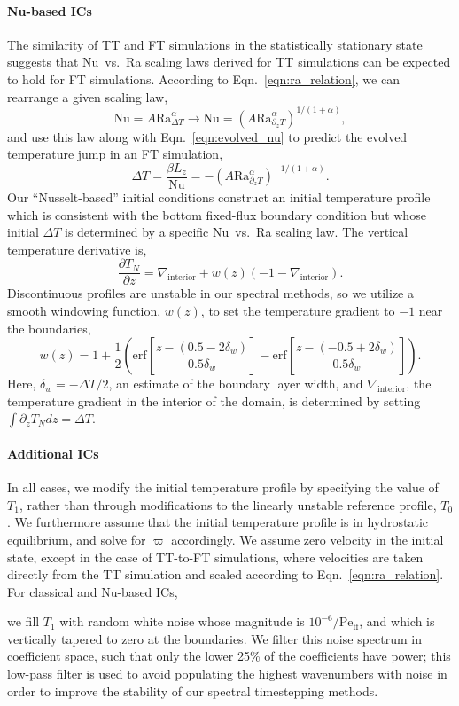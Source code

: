 \documentclass[aps, pre, onecolumn, nofootinbib, notitlepage, groupedaddress, amsfonts, amssymb, amsmath, longbibliography, superscriptaddress]{revtex4-1}
\newcommand{\grad}{\ensuremath{\nabla}}
\newcommand{\Peff}{\ensuremath{\text{Pe}_{\text{ff}}}}
\newcommand{\ea}[1]{{\color{red} #1}}
\begin{document}
\ea{
\paragraph{Nu-based ICs} 
The similarity of TT and FT simulations in the statistically stationary state suggests that Nu~vs.~Ra scaling laws derived for TT simulations can be expected to hold for FT simulations.
According to Eqn.~\ref{eqn:ra_relation}, we can rearrange a given scaling law,
\begin{equation}
\text{Nu} = A \text{Ra}_{\Delta T}^{\alpha} \rightarrow \text{Nu} = (A \text{Ra}_{\partial_z T}^{\alpha})^{1/(1+\alpha)},
\end{equation}
and use this law along with Eqn.~\ref{eqn:evolved_nu} to predict the evolved temperature jump in an FT simulation,
\begin{equation}
\Delta T = \frac{\beta L_z}{\text{Nu}} = -(A \text{Ra}_{\partial_z T}^{\alpha})^{-1/(1+\alpha)}.
\end{equation}
Our ``Nusselt-based'' initial conditions construct an initial temperature profile which is consistent with the bottom fixed-flux boundary condition but whose initial $\Delta T$ is determined by a specific Nu~vs.~Ra scaling law.
The vertical temperature derivative is,
\begin{equation}
\frac{\partial T_N}{\partial z} = \grad_{\text{interior}} + w(z)(-1 - \grad_{\text{interior}}).
\end{equation}
Discontinuous profiles are unstable in our spectral methods, so we utilize a smooth windowing function, $w(z)$, to set the temperature gradient to $-1$ near the boundaries,
$$
w(z) = 1 + \frac{1}{2}\left(\text{erf}\left[\frac{z - (0.5 - 2\delta_w)}{0.5\delta_w}\right] - \text{erf}\left[\frac{z - (-0.5 + 2\delta_w)}{0.5\delta_w}\right]\right).
$$
Here, $\delta_w = -\Delta T / 2$, an estimate of the boundary layer width, and $\grad_{\text{interior}}$, the temperature gradient in the interior of the domain, is determined by setting $\int \partial_z T_N dz = \Delta T$.



\paragraph{Additional ICs}
In all cases, we modify the initial temperature profile by specifying the value of $T_1$, rather than through modifications to the linearly unstable reference profile, $T_0$.
We furthermore assume that the initial temperature profile is in hydrostatic equilibrium, and solve for $\varpi$ accordingly.
We assume zero velocity in the initial state, except in the case of TT-to-FT simulations, where velocities are taken directly from the TT simulation and scaled according to Eqn.~\ref{eqn:ra_relation}.
For classical and Nu-based ICs,
}
we fill $T_1$ with random white noise whose magnitude is $10^{-6}/\Peff$, and which is vertically tapered to zero at the boundaries.
We filter this noise spectrum in coefficient space, such that only the lower 25\% of the coefficients have power; this low-pass filter is used to avoid populating the highest wavenumbers with noise in order to improve the stability of our spectral timestepping methods.
\end{document}
